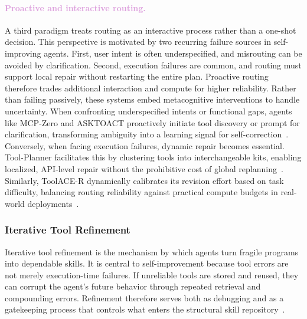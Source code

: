 \paragraph{\textcolor{Plum}{Proactive and interactive routing.}}
A third paradigm treats routing as an interactive process rather than a one-shot decision. This perspective is motivated by two recurring failure sources in self-improving agents. First, user intent is often underspecified, and misrouting can be avoided by clarification. Second, execution failures are common, and routing must support local repair without restarting the entire plan. Proactive routing therefore trades additional interaction and compute for higher reliability. Rather than failing passively, these systems embed metacognitive interventions to handle uncertainty. When confronting underspecified intents or functional gaps, agents like MCP-Zero and ASKTOACT proactively initiate tool discovery or prompt for clarification, transforming ambiguity into a learning signal for self-correction~\citep{fei2025mcpzeroactivetooldiscovery, zhang2025asktoactenhancingllmstool}. Conversely, when facing execution failures, dynamic repair becomes essential. Tool-Planner facilitates this by clustering tools into interchangeable kits, enabling localized, API-level repair without the prohibitive cost of global replanning~\citep{liu2025toolplannertaskplanningclusters}. Similarly, ToolACE-R dynamically calibrates its revision effort based on task difficulty, balancing routing reliability against practical compute budgets in real-world deployments~\citep{zeng2025toolacermodelawareiterativetraining}.

\subsubsection{Iterative Tool Refinement}
\label{sec:Iterative_Tool_Refinement}

Iterative tool refinement is the mechanism by which agents turn fragile programs into dependable skills. It is central to self-improvement because tool errors are not merely execution-time failures. If unreliable tools are stored and reused, they can corrupt the agent's future behavior through repeated retrieval and compounding errors. Refinement therefore serves both as debugging and as a gatekeeping process that controls what enters the structural skill repository~\citep{11185878, dolcetti2025helpingllmsimprovecode, petrovic2025surveygenaiautomotivesoftware}.



